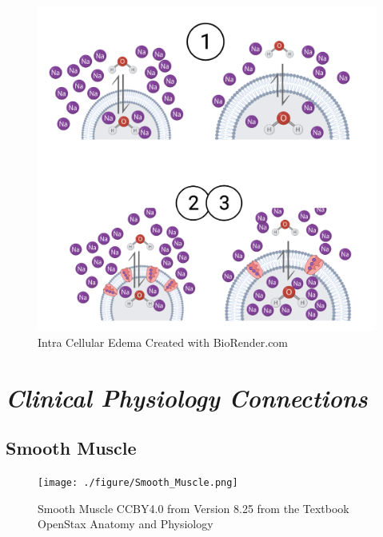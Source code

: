 \begin{figure}[!h]
    \centering
    \includegraphics[width=1\linewidth]{./figure/Intracellular_Edema.png}
    \caption{Intra Cellular Edema \footnotesize{Created with BioRender.com}}
    \label{fig:Intracellular_Edema}
\end{figure}

\section{\textit{Clinical Physiology Connections}}

\subsection{Smooth Muscle}

\begin{figure}[!h]
    \centering
    \texttt{[image: ./figure/Smooth\_Muscle.png]}
    \caption{Smooth Muscle \footnotesize{CCBY4.0 from Version 8.25 from the Textbook OpenStax Anatomy and Physiology}}
    \label{fig:Smooth_Muscle}
\end{figure}


\printbibliography[heading=subbibintoc]
